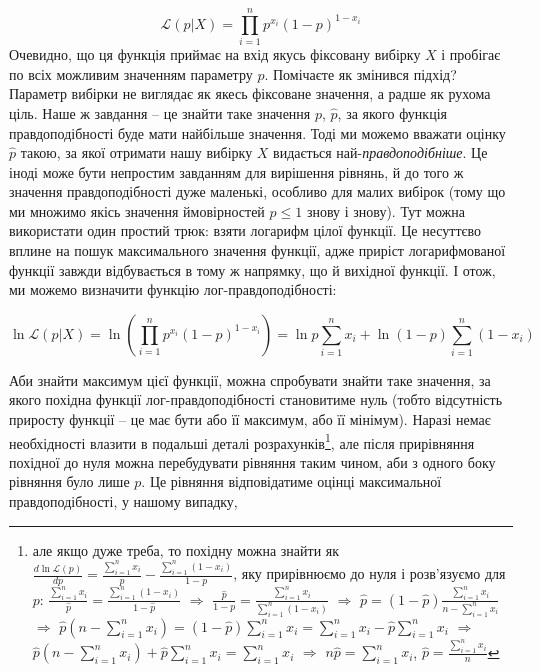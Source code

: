 \documentclass[
  11pt,
]{book}
\begin{document}
\[\mathcal{L}(p|X) = \prod \limits_{i = 1}^n p^{x_i} (1 - p)^{1-x_i}\]
Очевидно, що ця функція приймає на вхід якусь фіксовану вибірку \(X\) і
пробігає по всіх можливим значенням параметру \(p\). Помічаєте як
змінився підхід? Параметр вибірки не виглядає як якесь фіксоване
значення, а радше як рухома ціль. Наше ж завдання -- це знайти таке
значення \(p\), \(\hat{p}\), за якого функція правдоподібності буде мати
найбільше значення. Тоді ми можемо вважати оцінку \(\hat{p}\) такою, за
якої отримати нашу вибірку \(X\) видається най-\emph{правдоподібніше}.
Це іноді може бути непростим завданням для вирішення рівнянь, й до того
ж значення правдоподібності дуже маленькі, особливо для малих вибірок
(тому що ми множимо якісь значення ймовірностей \(p \leq 1\) знову і
знову). Тут можна використати один простий трюк: взяти логарифм цілої
функції. Це несуттєво вплине на пошук максимального значення функції,
адже приріст логарифмованої функції завжди відбувається в тому ж
напрямку, що й вихідної функції. І отож, ми можемо визначити функцію
лог-правдоподібності:

\[\ln \mathcal{L}(p|X) = \ln \left( \prod \limits_{i = 1}^n p^{x_i} (1 - p)^{1-x_i} \right) = \ln p \sum \limits_{i=1}^n x_i + \ln (1-p) \sum \limits_{i=1}^n (1 - x_i)\]

Аби знайти максимум цієї функції, можна спробувати знайти таке значення,
за якого похідна функції лог-правдоподібності становитиме нуль (тобто
відсутність приросту функції -- це має бути або її максимум, або її
мінімум). Наразі немає необхідності влазити в подальші деталі
розрахунків\footnote{але якщо дуже треба, то похідну можна знайти як
  \(\frac{d \ln \mathcal{L} (p)}{d p} = \frac{\sum_{i=1}^n x_i}{p} - \frac{\sum_{i=1}^n (1 - x_i)}{1-p}\),
  яку прирівнюємо до нуля і розв'язуємо для \(p\):
  \(\frac{\sum_{i=1}^n x_i}{\hat{p}} = \frac{\sum_{i=1}^n (1 - x_i)}{1-\hat{p}}\)
  \(\Rightarrow\)
  \(\frac{\hat{p}}{1 - p} = \frac{\sum_{i=1}^n x_i}{\sum_{i=1}^n (1 - x_i)}\)
  \(\Rightarrow\)
  \(\hat{p} = (1 - \hat{p}) \frac{\sum_{i=1}^n x_i}{n - \sum_{i=1}^n x_i}\)
  \(\Rightarrow\)
  \(\hat{p} (n - \sum_{i=1}^n x_i) = (1 - \hat{p}) \sum_{i=1}^n x_i = \sum_{i=1}^n x_i - \hat{p} \sum_{i=1}^n x_i\)
  \(\Rightarrow\)
  \(\hat{p} (n - \sum_{i=1}^n x_i) + \hat{p} \sum_{i=1}^n x_i = \sum_{i=1}^n x_i\)
  \(\Rightarrow\) \(n\hat{p} = \sum_{i=1}^n x_i\),
  \(\hat{p} = \frac{\sum_{i=1}^n x_i}{n}\)}, але після прирівняння
похідної до нуля можна перебудувати рівняння таким чином, аби з одного
боку рівняння було лише \(p\). Це рівняння відповідатиме оцінці
максимальної правдоподібності, у нашому випадку,
\end{document}
